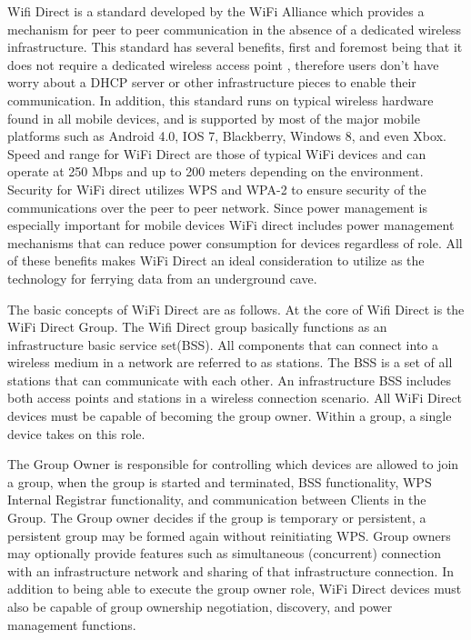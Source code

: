\documentclass[10pt,twocolumn]{article}
\begin{document}
Wifi Direct is a standard developed by the WiFi Alliance which provides a mechanism for peer to peer communication in the absence of a dedicated wireless infrastructure. 
This standard has several benefits, first and foremost being that it does not require a dedicated wireless access point \cite{whywifid}
, therefore users don't have worry about a DHCP server or other infrastructure pieces to enable their communication. 
In addition, this standard runs on typical wireless hardware found in all mobile devices, and is supported by most of the major mobile platforms such as Android 4.0, IOS 7, Blackberry, Windows 8, and even Xbox. 
Speed and range for WiFi Direct are those of typical WiFi devices and can operate at 250 Mbps and up to 200 meters depending on the environment. 
Security for WiFi direct utilizes WPS and WPA-2 to ensure security of the communications over the peer to peer network. 
Since power management is especially important for mobile devices WiFi direct includes power management mechanisms that can reduce power consumption for devices regardless of role.
All of these benefits makes WiFi Direct an ideal consideration to utilize as the technology for ferrying data from an underground cave.

The basic concepts of WiFi Direct are as follows. 
At the core of Wifi Direct is the WiFi Direct Group. 
The Wifi Direct group basically functions as an infrastructure basic service set(BSS). 
All components that can connect into a wireless medium in a network are referred to as stations. 
The BSS is a set of all stations that can communicate with each other. 
An infrastructure BSS includes both access points and stations in a wireless connection scenario.\cite{wirelesslanwiki}
All WiFi Direct devices must be capable of becoming the group owner. 
Within a group, a single device takes on this role.
 
The Group Owner is responsible for controlling which devices are allowed to join a group, when the group is started and terminated, BSS functionality, WPS Internal Registrar functionality, and communication between Clients in the Group. 
The Group owner decides if the group is temporary or persistent, a persistent group may be formed again without reinitiating WPS.
Group owners may optionally provide features such as simultaneous (concurrent) connection with an infrastructure network and sharing of that infrastructure connection. 
In addition to being able to execute the group owner role, WiFi Direct devices must also be capable of group ownership negotiation, discovery, and power management functions.
 
\end{document}
